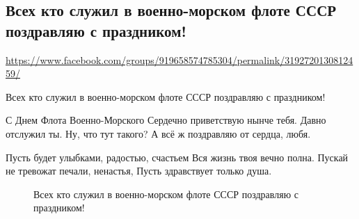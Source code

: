  
 
  
\clearpage
\subsection{Всех кто служил в военно-морском флоте СССР поздравляю с праздником!}
\url{https://www.facebook.com/groups/919658574785304/permalink/3192720130812459/}


Всех кто служил в военно-морском флоте СССР поздравляю с праздником!

С Днем Флота Военно-Морского
Сердечно приветствую нынче тебя.
Давно отслужил ты. Ну, что тут такого?
А всё ж поздравляю от сердца, любя.

Пусть будет улыбками, радостью, счастьем
Вся жизнь твоя вечно полна.
Пускай не тревожат печали, ненастья,
Пусть здравствует только душа.

\begin{figure}[ht]
 \centering
 \caption{Всех кто служил в военно-морском флоте СССР поздравляю с праздником!}
 \label{fig:}
\end{figure}
  
